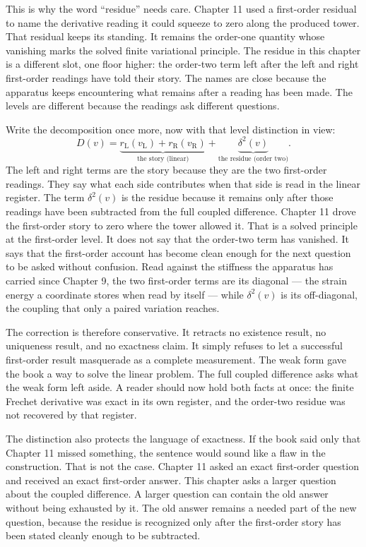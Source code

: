 This is why the word ``residue'' needs care. Chapter 11 used a first-order
residual to name the derivative reading it could squeeze to zero along the
produced tower. That residual keeps its standing. It remains the order-one
quantity whose vanishing marks the solved finite variational principle. The
residue in this chapter is a different slot, one floor higher: the order-two
term left after the left and right first-order readings have told their story.
The names are close because the apparatus keeps encountering what remains
after a reading has been made. The levels are different because the readings
ask different questions.

Write the decomposition once more, now with that level distinction in view:
\[
  D(v) = \underbrace{r_{\mathrm{L}}(v_{\mathrm{L}}) + r_{\mathrm{R}}(v_{\mathrm{R}})}_{\text{the story (linear)}}
         + \underbrace{\delta^2(v)}_{\text{the residue (order two)}}.
\]
The left and right terms are the story because they are the two first-order
readings. They say what each side contributes when that side is read in the
linear register. The term \(\delta^2(v)\) is the residue because it remains
only after those readings have been subtracted from the full coupled
difference. Chapter 11 drove the first-order story to zero where the tower
allowed it. That is a solved principle at the first-order level. It does not
say that the order-two term has vanished. It says that the first-order account
has become clean enough for the next question to be asked without confusion.
Read against the stiffness the apparatus has carried since Chapter 9, the two
first-order terms are its diagonal --- the strain energy a coordinate stores when
read by itself --- while \(\delta^2(v)\) is its off-diagonal, the coupling that only
a paired variation reaches.

The correction is therefore conservative. It retracts no existence result, no
uniqueness result, and no exactness claim. It simply refuses to let a
successful first-order result masquerade as a complete measurement. The weak
form gave the book a way to solve the linear problem. The full coupled
difference asks what the weak form left aside. A reader should now hold both
facts at once: the finite Frechet derivative was exact in its own register, and
the order-two residue was not recovered by that register.

The distinction also protects the language of exactness. If the book said only
that Chapter 11 missed something, the sentence would sound like a flaw in the
construction. That is not the case. Chapter 11 asked an exact first-order
question and received an exact first-order answer. This chapter asks a larger
question about the coupled difference. A larger question can contain the old
answer without being exhausted by it. The old answer remains a needed part of
the new question, because the residue is recognized only after the first-order
story has been stated cleanly enough to be subtracted.

